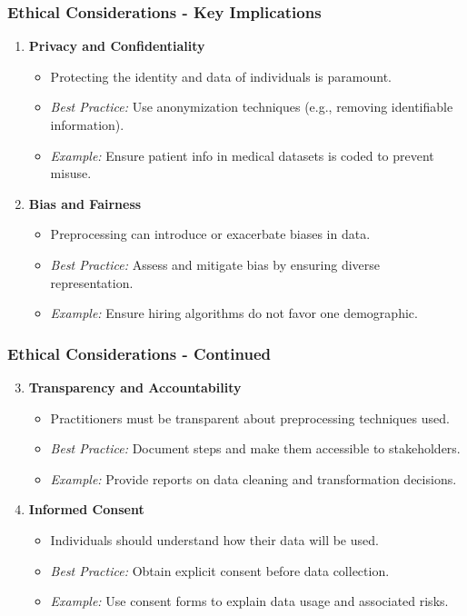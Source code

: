 \documentclass{beamer}
\begin{document}
\begin{frame}[fragile]
    \frametitle{Ethical Considerations - Key Implications}
    \begin{enumerate}
        \item \textbf{Privacy and Confidentiality}
            \begin{itemize}
                \item Protecting the identity and data of individuals is paramount.
                \item \textit{Best Practice:} Use anonymization techniques (e.g., removing identifiable information).
                \item \textit{Example:} Ensure patient info in medical datasets is coded to prevent misuse.
            \end{itemize}

        \item \textbf{Bias and Fairness}
            \begin{itemize}
                \item Preprocessing can introduce or exacerbate biases in data.
                \item \textit{Best Practice:} Assess and mitigate bias by ensuring diverse representation.
                \item \textit{Example:} Ensure hiring algorithms do not favor one demographic.
            \end{itemize}
    \end{enumerate}
\end{frame}

\begin{frame}[fragile]
    \frametitle{Ethical Considerations - Continued}
    \begin{enumerate}
        \setcounter{enumi}{2}
        \item \textbf{Transparency and Accountability}
            \begin{itemize}
                \item Practitioners must be transparent about preprocessing techniques used.
                \item \textit{Best Practice:} Document steps and make them accessible to stakeholders.
                \item \textit{Example:} Provide reports on data cleaning and transformation decisions.
            \end{itemize}

        \item \textbf{Informed Consent}
            \begin{itemize}
                \item Individuals should understand how their data will be used.
                \item \textit{Best Practice:} Obtain explicit consent before data collection.
                \item \textit{Example:} Use consent forms to explain data usage and associated risks.
            \end{itemize}
    \end{enumerate}
\end{frame}
\end{document}
